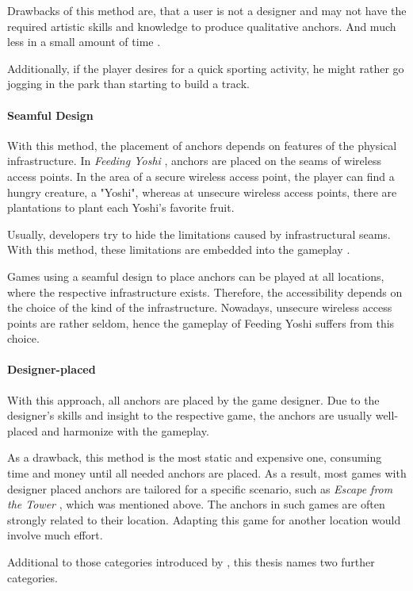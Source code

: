 Drawbacks of this method are, that a user is not a designer and may not have the required artistic skills and knowledge to produce qualitative anchors. And much less in a small amount of time \citep{carraca2014procedural}.

Additionally, if the player desires for a quick sporting activity, he might rather go jogging in the park than starting to build a track.

\paragraph{Seamful Design}
With this method, the placement of anchors depends on features of the physical infrastructure. In \emph{Feeding Yoshi} \citep{reid2008design}, anchors are placed on the seams of wireless access points. In the area of a secure wireless access point, the player can find a hungry creature, a "Yoshi", whereas at unsecure wireless access points, there are plantations to plant each Yoshi's favorite fruit.

Usually, developers try to hide the limitations caused by infrastructural seams. With this method, these limitations are embedded into the gameplay \citep{broll2005seamful}.

Games using a seamful design to place anchors can be played at all locations, where the respective infrastructure exists. Therefore, the accessibility depends on the choice of the kind of the infrastructure. Nowadays, unsecure wireless access points are rather seldom, hence the gameplay of Feeding Yoshi suffers from this choice.

\paragraph{Designer-placed}
With this approach, all anchors are placed by the game designer. Due to the designer's skills and insight to the respective game, the anchors are usually well-placed and harmonize with the gameplay.

As a drawback, this method is the most static and expensive one, consuming time and money until all needed anchors are placed. As a result, most games with designer placed anchors are tailored for a specific scenario, such as \emph{Escape from the Tower} \citep{EscapeFromTheTower}, which was mentioned above. The anchors in such games are often strongly related to their location. Adapting this game for another location would involve much effort.

Additional to those categories introduced by \citeauthor{reid2008design}, this thesis names two further categories.


